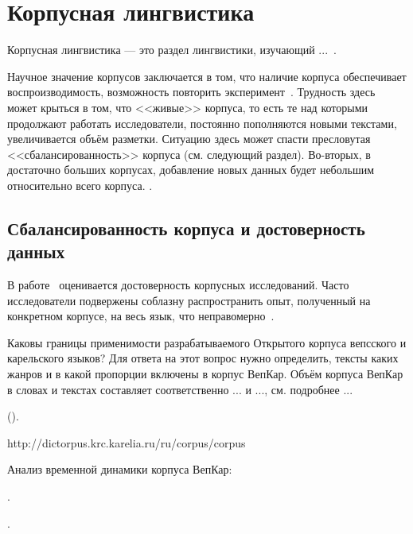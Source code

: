 \section{Корпусная лингвистика} \label{sect_review_corpus_linguistics}

Корпусная лингвистика --- это раздел лингвистики, изучающий ...~\cite{Zakharov2005}.


Научное значение корпусов заключается в том, что наличие корпуса обеспечивает воспроизводимость, возможность повторить эксперимент~\cite[с.~409]{Kibrik2019}. Трудность здесь может крыться в том, что <<живые>> корпуса, то есть те над которыми продолжают работать исследователи, постоянно пополняются новыми текстами, увеличивается объём разметки. Ситуацию здесь может спасти пресловутая <<сбалансированность>> корпуса (см. следующий раздел). 
Во-вторых, в достаточно больших корпусах, добавление новых данных будет небольшим относительно всего корпуса. . 

\subsection{Сбалансированность корпуса и достоверность данных}

В работе~\cite{Belikov2013}
оценивается достоверность корпусных исследований. 
Часто исследователи подвержены соблазну распространить опыт, полученный на конкретном корпусе, 
на весь язык, что неправомерно~\cite{Belikov2013}.

Каковы границы применимости разрабатываемого Открытого корпуса вепсского и карельского языков? 
Для ответа на этот вопрос нужно определить, тексты каких жанров и в какой пропорции включены в корпус ВепКар. 
Объём корпуса ВепКар в словах и текстах составляет соответственно ... и ..., см. подробнее ... 

().


http://dictorpus.krc.karelia.ru/ru/corpus/corpus

\bigskip

Анализ временной динамики корпуса ВепКар: 

.

.

